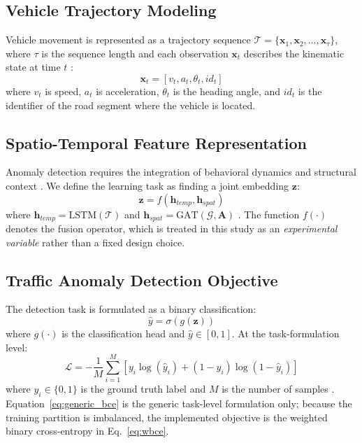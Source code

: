 \documentclass[journal]{IEEEtran}
\begin{document}
\subsection{Vehicle Trajectory Modeling}
Vehicle movement is represented as a trajectory sequence $\mathcal{T} = \{\mathbf{x}_1, \mathbf{x}_2, \dots, \mathbf{x}_\tau\}$, where $\tau$ is the sequence length and each observation $\mathbf{x}_t$ describes the kinematic state at time $t$ \cite{zhou_hybrid_2022, taheri_sarteshnizi_applicability_2026}:
\begin{equation}
  \mathbf{x}_t = [v_t, a_t, \theta_t, id_t]
\end{equation}
where $v_t$ is speed, $a_t$ is acceleration, $\theta_t$ is the heading angle, and $id_t$ is the identifier of the road segment where the vehicle is located.

\subsection{Spatio-Temporal Feature Representation}
Anomaly detection requires the integration of behavioral dynamics and structural context \cite{hu_dynamic_2026, zhu_spatio-temporal_2026}. We define the learning task as finding a joint embedding $\mathbf{z}$:
\begin{equation}
  \mathbf{z} = f(\mathbf{h}_{temp}, \mathbf{h}_{spat})
\end{equation}
where $\mathbf{h}_{temp} = \text{LSTM}(\mathcal{T})$ and $\mathbf{h}_{spat} = \text{GAT}(\mathcal{G}, \mathbf{A})$ \cite{xia_attention-based_2023, wang_multi-scale_2025}. The function $f(\cdot)$ denotes the fusion operator, which is treated in this study as an \emph{experimental variable} rather than a fixed design choice.

\subsection{Traffic Anomaly Detection Objective}
The detection task is formulated as a binary classification:
\begin{equation}
  \hat{y} = \sigma(g(\mathbf{z}))
\end{equation}
where $g(\cdot)$ is the classification head and $\hat{y} \in [0, 1]$. At the task-formulation level:
\begin{equation}
  \label{eq:generic_bce}
  \mathcal{L} = -\frac{1}{M} \sum_{i=1}^{M} [y_i \log(\hat{y}_i) + (1 - y_i) \log(1 - \hat{y}_i)]
\end{equation}
where $y_i \in \{0, 1\}$ is the ground truth label and $M$ is the number of samples \cite{feng_traffic_2024, sun_framework_2025, ma_utfp-ad_2025}. Equation~\ref{eq:generic_bce} is the generic task-level formulation only; because the training partition is imbalanced, the implemented objective is the weighted binary cross-entropy in Eq.~\ref{eq:wbce}.
\end{document}
